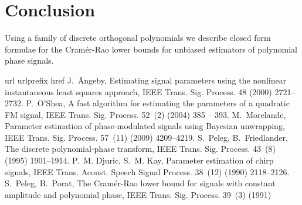 \documentclass[review]{elsarticle}
\begin{document}
 
\section{Conclusion}
Using a family of discrete orthogonal polynomials we describe closed form formulae for the Cram\'{e}r-Rao lower bounds for unbiased estimators of polynomial phase signals.


\small
%

\begin{thebibliography}{10}
\expandafter\ifx\csname url\endcsname\relax
  \def\url#1{\texttt{#1}}\fi
\expandafter\ifx\csname urlprefix\endcsname\relax\def\urlprefix{URL }\fi
\expandafter\ifx\csname href\endcsname\relax
  \def\href#1#2{#2} \def\path#1{#1}\fi
J.~\"Angeby, Estimating signal parameters using the nonlinear instantaneous
  least squares approach, IEEE Trans. Sig. Process. 48 (2000) 2721--2732.
P.~O'Shea, A fast algorithm for estimating the parameters of a quadratic {FM}
  signal, IEEE Trans. Sig. Process. 52~(2) (2004) 385 -- 393.
M.~Morelande, Parameter estimation of phase-modulated signals using {Bayesian}
  unwrapping, IEEE Trans. Sig. Process. 57~(11) (2009) 4209--4219.
S.~Peleg, B.~Friedlander, The discrete polynomial-phase transform, IEEE Trans.
  Sig. Process. 43~(8) (1995) 1901--1914.
P.~M. Djuric, S.~M. Kay, Parameter estimation of chirp signals, IEEE Trans.
  Acoust. Speech Signal Process. 38~(12) (1990) 2118--2126.
S.~Peleg, B.~Porat, The {Cram\'{e}r-Rao} lower bound for signals with constant
  amplitude and polynomial phase, IEEE Trans. Sig. Process. 39~(3) (1991)

\end{thebibliography}
\end{document}
